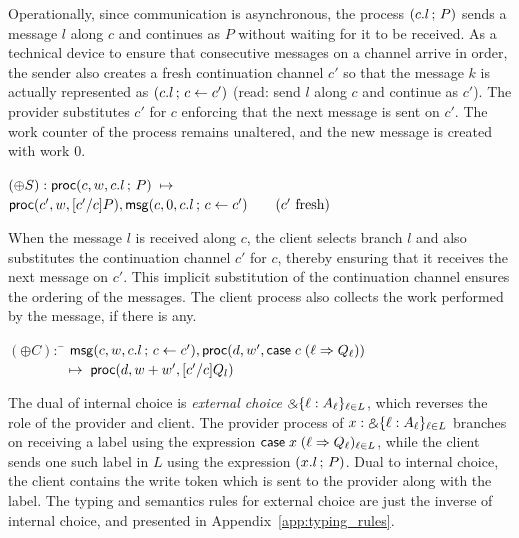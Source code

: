 Operationally, since communication is asynchronous, the process
$(c.l \, ; \, P)$ sends a message $l$
along $c$ and continues as $P$ without waiting for it to be received.
As a technical device to ensure that consecutive messages on a
channel arrive in order, the sender also creates a fresh continuation
channel $c'$ so that the message $k$ is actually represented as
$(c.l \, ; \, c \leftarrow c')$ (read: send $l$ along $c$ and
continue as $c'$). The provider substitutes $c'$ for $c$ enforcing
that the next message is sent on $c'$.
The work counter of the process remains unaltered, and the new message
is created with work $0$.
\begin{tabbing}
$(\oplus S) : \mathsf{proc}(c, w, c.l \, ; \, P) \; \mapsto \;$ \\
\qquad $\mathsf{proc}(c', w, [c'/c]P),
\mathsf{msg}(c, 0, c.l \, ; \, c \leftarrow c') \qquad (c' \text{ fresh})$
\end{tabbing}
When the message $l$ is received along $c$, the client selects branch
$l$ and also substitutes the continuation channel $c'$ for $c$, thereby
ensuring that it receives the next message on $c'$. This implicit
substitution of the continuation channel ensures the ordering of the
messages.
The client process also collects the work performed by the message, if
there is any.
\begin{tabbing}
$(\oplus C) :$ \= $\mathsf{msg}(c, w, c.l \, ; \, c \leftarrow c'),
\mathsf{proc}(d, w', \mathsf{case} \; c \; (\ell \Rightarrow Q_\ell))$ \\
$\qquad \qquad \; \mapsto \; \mathsf{proc}(d, w+w',[c'/c]Q_l)$
\end{tabbing}

The dual of internal choice is \emph{external choice} $\mathbin{\binampersand} \{ \ell :
A_\ell \}_{\ell \in L}$, which reverses the role of the provider and client.
The provider process of $x : \mathbin{\binampersand} \{ \ell : A_\ell \}_{\ell \in L}$ branches on receiving a label
using the expression $\mathsf{case} \; x \; (\ell \Rightarrow Q_\ell)_{\ell \in L}$,
while the client sends one such label in $L$ using the expression $(x.l \, ; \, P)$.
Dual to internal choice, the client contains the write token which is
sent to the provider along with the label.
The typing and semantics rules for external choice are just the inverse of internal choice,
and presented in Appendix~\ref{app:typing_rules}.

